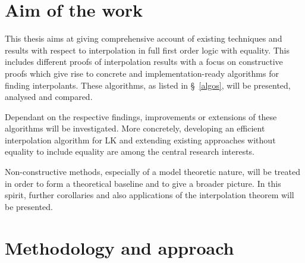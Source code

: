 \documentclass[,%
			paper=a4,%
			DIV11, %
			liststotoc,
			bibtotoc,
			draft=false,%
			numbers=noendperiod
			]{scrartcl}
\begin{document}


\begin{comment}
Software verification
Model checking
Derive invariants
interpolation by its nature disregards all but the predicates relevant to a certain property
can be used for predicate refinement in cegar

often restricted to weaker logics, application to more powerful formalisms such as fol with equality is relevant 
\end{comment}

\section{Aim of the work}


This thesis aims at giving comprehensive account of existing techniques and results with respect to interpolation in full first order logic with equality.
This includes different proofs of interpolation results with a focus on constructive proofs which give rise to concrete and implementation-ready algorithms for finding interpolants.
These algorithms, as listed in \S~\ref{algos}, will be presented, analysed and compared. 

Dependant on the respective findings, improvements or extensions of these algorithms will be investigated.
More concretely, developing an efficient interpolation algorithm for LK and extending existing approaches without equality to include equality are among the central research interests.

Non-constructive methods, especially of a model theoretic nature, will be treated in order to form a theoretical baseline and to give a broader picture.
In this spirit, further corollaries and also applications of the interpolation theorem will be presented.



\section{Methodology and approach}
\end{document}
